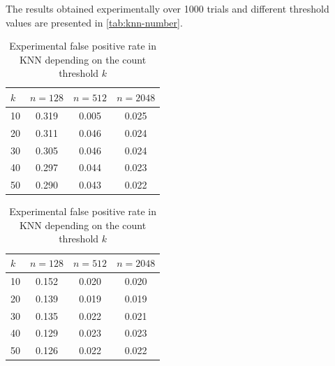 \noindent
The results obtained experimentally over 1000 trials and different threshold values are presented in \autoref{tab:knn-number}.
\begin{table}[ht]
    \centering
    \begin{subtable}[t]{0.45\textwidth}
        \centering
        \caption{The random dataset}
        \begin{tabular}{lccc}
            \toprule
            \( k \) & \( n = 128 \) & \( n = 512 \) & \( n = 2048 \) \\
            \midrule
            10 & 0.319 & 0.005 & 0.025 \\
            20 & 0.311 & 0.046 & 0.024 \\
            30 & 0.305 & 0.046 & 0.024 \\
            40 & 0.297 & 0.044 & 0.023 \\
            50 & 0.290 & 0.043 & 0.022 \\
            \bottomrule
        \end{tabular}
    \end{subtable}%
    \hfill
    \begin{subtable}[t]{0.45\textwidth}
        \centering
        \caption{The hydrocarbon dataset}
        \begin{tabular}{lccc}
            \toprule
            \( k \) & \( n = 128 \) & \( n = 512 \) & \( n = 2048 \) \\
            \midrule
            10 & 0.152 & 0.020 & 0.020 \\
            20 & 0.139 & 0.019 & 0.019 \\
            30 & 0.135 & 0.022 & 0.021 \\
            40 & 0.129 & 0.023 & 0.023 \\
            50 & 0.126 & 0.022 & 0.022 \\
            \bottomrule
        \end{tabular}
    \end{subtable}
    \caption{Experimental false positive rate in KNN depending on the count threshold \( k \)}
    \label{tab:knn-number}
\end{table}


